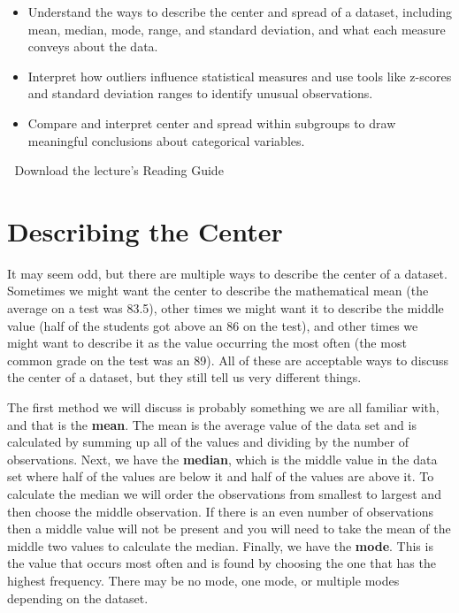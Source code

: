 \documentclass[
  letterpaper,
  DIV=11,
  numbers=noendperiod]{scrreprt}
\providecommand{\tightlist}{%
  \setlength{\itemsep}{0pt}\setlength{\parskip}{0pt}}
\begin{document}
\begin{itemize}
\tightlist
\item
  Understand the ways to describe the center and spread of a dataset,
  including mean, median, mode, range, and standard deviation, and what
  each measure conveys about the data.
\item
  Interpret how outliers influence statistical measures and use tools
  like z-scores and standard deviation ranges to identify unusual
  observations.
\item
  Compare and interpret center and spread within subgroups to draw
  meaningful conclusions about categorical variables.
\end{itemize}

\begin{tcolorbox}[enhanced jigsaw, colbacktitle=quarto-callout-tip-color!10!white, breakable, bottomrule=.15mm, colframe=quarto-callout-tip-color-frame, left=2mm, opacitybacktitle=0.6, title=\textcolor{quarto-callout-tip-color}{\faLightbulb}\hspace{0.5em}{Supplemental Material}, leftrule=.75mm, opacityback=0, rightrule=.15mm, titlerule=0mm, bottomtitle=1mm, colback=white, toprule=.15mm, arc=.35mm, toptitle=1mm, coltitle=black]

📄 Download the lecture's Reading Guide

\end{tcolorbox}

\section{Describing the Center}\label{describing-the-center}

It may seem odd, but there are multiple ways to describe the center of a
dataset. Sometimes we might want the center to describe the mathematical
mean (the average on a test was 83.5), other times we might want it to
describe the middle value (half of the students got above an 86 on the
test), and other times we might want to describe it as the value
occurring the most often (the most common grade on the test was an 89).
All of these are acceptable ways to discuss the center of a dataset, but
they still tell us very different things.

The first method we will discuss is probably something we are all
familiar with, and that is the \textbf{mean}. The mean is the average
value of the data set and is calculated by summing up all of the values
and dividing by the number of observations. Next, we have the
\textbf{median}, which is the middle value in the data set where half of
the values are below it and half of the values are above it. To
calculate the median we will order the observations from smallest to
largest and then choose the middle observation. If there is an even
number of observations then a middle value will not be present and you
will need to take the mean of the middle two values to calculate the
median. Finally, we have the \textbf{mode}. This is the value that
occurs most often and is found by choosing the one that has the highest
frequency. There may be no mode, one mode, or multiple modes depending
on the dataset.
\end{document}
